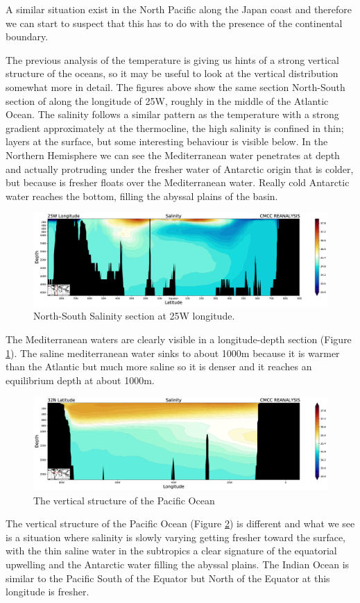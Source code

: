 A similar situation exist in the North Pacific along the Japan coast and
therefore we can start to suspect that this has to do with the presence
of the continental boundary.

The previous analysis of the temperature is giving us hints of a strong
vertical structure of the oceans, so it may be useful to look at the
vertical distribution somewhat more in detail. The figures above show the same section North-South section of along the longitude of 25W, roughly in the middle of the Atlantic Ocean.
The salinity follows a similar pattern as the temperature with a
strong gradient approximately at the thermocline, the high salinity is
confined in thin; layers at the surface, but some interesting behaviour
is visible below. In the Northern Hemisphere we can see the
Mediterranean water penetrates at depth and actually protruding under the fresher water of Antarctic origin that is colder, but because is
fresher floats over the Mediterranean water. Really cold Antarctic water reaches the bottom, filling the abyssal plains of the basin.

\begin{figure}[htpb!]
	\centering
	\includegraphics[width = 0.5 \textwidth]{uploads/31image.png}
	\caption{North-South Salinity section at 25W longitude.}
	\label{fig:fig6}
\end{figure}

The Mediterranean waters are clearly visible in a longitude-depth
section (Figure \ref{fig:fig6}). The saline mediterranean water sinks
to about 1000m because it is warmer than the Atlantic but much more
saline so it is denser and it reaches an equilibrium depth at about
1000m.

\begin{figure}[htpb!]
	\centering
	\includegraphics[width=0.5\linewidth]{uploads/32image.png}
	\caption{The vertical structure of the Pacific Ocean}
	\label{fig:fig7}
\end{figure}


The vertical structure of the Pacific Ocean (Figure \ref{fig:fig7}) is
different and what we see is a situation where salinity is slowly
varying getting fresher toward the surface, with the thin saline water
in the subtropics a clear signature of the equatorial upwelling and the
Antarctic water filling the abyssal plains. The Indian Ocean is similar
to the Pacific South of the Equator but North of the Equator at this
longitude is fresher.

